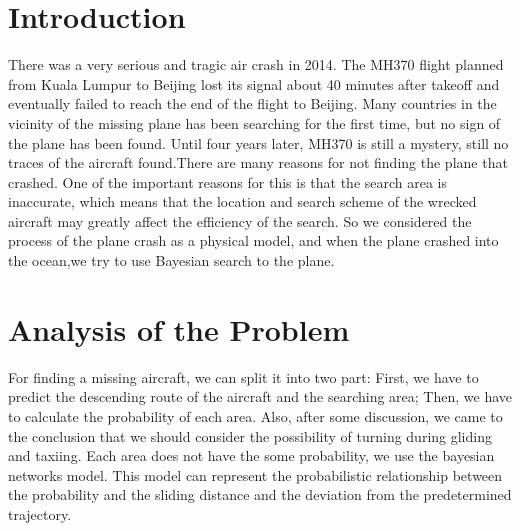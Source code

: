 \documentclass[11pt]{article}
\begin{document}
    
    
    \maketitle
    
 \tableofcontents   
\hypertarget{Introduction}{%
\section{Introduction}\label{Introduction}}
 \indent There was a very serious and tragic air crash in 2014. The MH370 flight planned from Kuala Lumpur to Beijing lost its signal about 40 minutes after takeoff and eventually failed to reach the end of the flight to Beijing. Many countries in the vicinity of the missing plane has been searching for the first time, but no sign of the plane has been found. Until four years later, MH370 is still a mystery, still no traces of the aircraft found.There are many reasons for not finding the plane that crashed. One of the important reasons for this is that the search area is inaccurate, which means that the location and search scheme of the wrecked aircraft may greatly affect the efficiency of the search. So we considered the process of the plane crash as a physical model, and when the plane crashed into the ocean,we try to use Bayesian search to the plane.\\
    
    \hypertarget{analysis-of-the-problem}{%
\section{Analysis of the Problem}\label{analysis-of-the-problem}}

For finding a missing aircraft, we can split it into two part: First, we
have to predict the descending route of the aircraft and the searching
area; Then, we have to calculate the probability of each area. Also,
after some discussion, we came to the conclusion that we should consider
the possibility of turning during gliding and taxiing. Each area does
not have the some probability, we use the bayesian networks model. This
model can represent the probabilistic relationship between the
probability and the sliding distance and the deviation from the
predetermined trajectory.
\end{document}
